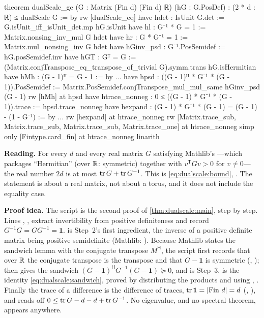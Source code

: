 \begin{leanbox}
\begin{leancode}
theorem dualScale_ge (G : Matrix (Fin d) (Fin d) ℝ) (hG : G.PosDef) :
    (2 * d : ℝ) ≤ dualScale G := by
  rw [dualScale_eq]
  have hdet : IsUnit G.det := G.isUnit_iff_isUnit_det.mp hG.isUnit
  have hl : G⁻¹ * G = 1 := Matrix.nonsing_inv_mul G hdet
  have hr : G * G⁻¹ = 1 := Matrix.mul_nonsing_inv G hdet
  have hGinv_psd : G⁻¹.PosSemidef := hG.posSemidef.inv
  have hGT : Gᵀ = G :=
    (Matrix.conjTranspose_eq_transpose_of_trivial G).symm.trans hG.isHermitian
  have hMh : (G - 1)ᴴ = G - 1 := by ...
  have hpsd : ((G - 1)ᴴ * G⁻¹ * (G - 1)).PosSemidef :=
    Matrix.PosSemidef.conjTranspose_mul_mul_same hGinv_psd (G - 1)
  rw [hMh] at hpsd
  have htrace_nonneg : 0 ≤ ((G - 1) * G⁻¹ * (G - 1)).trace :=
    hpsd.trace_nonneg
  have hexpand : (G - 1) * G⁻¹ * (G - 1) = (G - 1) - (1 - G⁻¹) := by ...
  rw [hexpand] at htrace_nonneg
  rw [Matrix.trace_sub, Matrix.trace_sub, Matrix.trace_sub,
    Matrix.trace_one] at htrace_nonneg
  simp only [Fintype.card_fin] at htrace_nonneg
  linarith
\end{leancode}
\textbf{Reading.} For every $d$ and every real matrix $G$ satisfying Mathlib's
---which packages ``Hermitian'' (over $\mathbb{R}$: symmetric) together with
$v^{\mathsf T}Gv>0$ for $v\ne0$---the real number $2d$ is at most $\operatorname{tr} G+\operatorname{tr} G^{-1}$. This is
\eqref{eq:dualscale:bound}, \TA. The statement is about a real matrix, not about a torus, and
it does not include the equality case.

\textbf{Proof idea.} The script is the second proof of \cref{thm:dualscale:main}, step by
step. Lines , ,  extract invertibility from positive definiteness
and record $G^{-1}G=GG^{-1}=\mathbf1$.  is Step~2's first ingredient, the
inverse of a positive definite matrix being positive semidefinite (Mathlib:
). Because Mathlib states the sandwich lemma with the conjugate transpose
$M^{\mathsf H}$, the script first records that over $\mathbb{R}$ the conjugate transpose is the
transpose and that $G-\mathbf1$ is symmetric (, ); then
 gives the sandwich
$(G-\mathbf1)^{\mathsf H}G^{-1}(G-\mathbf1)\succeq0$, and  is
Step~3.  is the identity \eqref{eq:dualscale:sandwich}, proved by distributing
the products and using , . Finally the trace of a difference is the
difference of traces, $\operatorname{tr}\mathbf1=|\mathrm{Fin}\ d|=d$ (,
), and  reads off
$0\le\operatorname{tr} G-d-d+\operatorname{tr} G^{-1}$. No eigenvalue, and no spectral theorem, appears anywhere.
\end{leanbox}

